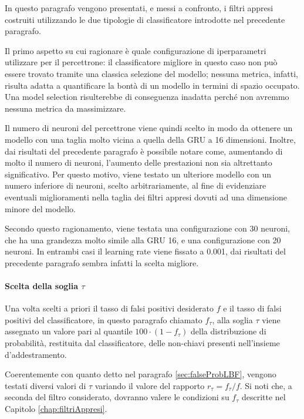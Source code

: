 \documentclass[../../main.tex]{subfiles}
\begin{document}
    In questo paragrafo vengono presentati, e messi a confronto, i filtri appresi costruiti utilizzando le due tipologie di classificatore introdotte nel precedente paragrafo.

    Il primo aspetto su cui ragionare è quale configurazione di iperparametri utilizzare per il percettrone: il classificatore migliore in questo caso non può essere trovato tramite una classica selezione del modello; nessuna metrica, infatti, risulta adatta a quantificare la bontà di un modello in termini di spazio occupato. Una model selection risulterebbe di conseguenza inadatta perché non avremmo nessuna metrica da massimizzare.

    Il numero di neuroni del percettrone viene quindi scelto in modo da ottenere un modello con una taglia molto vicina a quella della GRU a 16 dimensioni. Inoltre, dai risultati del precedente paragrafo è possibile notare come, aumentando di molto il numero di neuroni, l'aumento delle prestazioni non sia altrettanto significativo. Per questo motivo, viene testato un ulteriore modello con un numero inferiore di neuroni, scelto arbitrariamente, al fine di evidenziare eventuali miglioramenti nella taglia dei filtri appresi dovuti ad una dimensione minore del modello.

    Secondo questo ragionamento, viene testata una configurazione con 30 neuroni, che ha una grandezza molto simile alla GRU 16, e una configurazione con 20 neuroni. In entrambi casi il learning rate viene fissato a 0.001, dai risultati del precedente paragrafo sembra infatti la scelta migliore.
    
    \paragraph{Scelta della soglia $\tau$}
    Una volta scelti a priori il tasso di falsi positivi desiderato $f$ e il tasso di falsi positivi del classificatore, in questo paragrafo chiamato $f_{\tau}$, alla soglia $\tau$ viene assegnato un valore pari al quantile $100 \cdot (1 - f_{\tau})$ della distribuzione di probabilità, restituita dal classificatore, delle non-chiavi presenti nell'insieme d'addestramento.

    Coerentemente con quanto detto nel paragrafo \ref{sec:falseProbLBF}, vengono testati diversi valori di $\tau$ variando il valore del rapporto $r_{\tau} = f_{\tau}/f$. Si noti che, a seconda  del filtro considerato, dovranno valere le condizioni su $f_{\tau}$ descritte nel Capitolo \ref{chap:filtriAppresi}.
\end{document}
